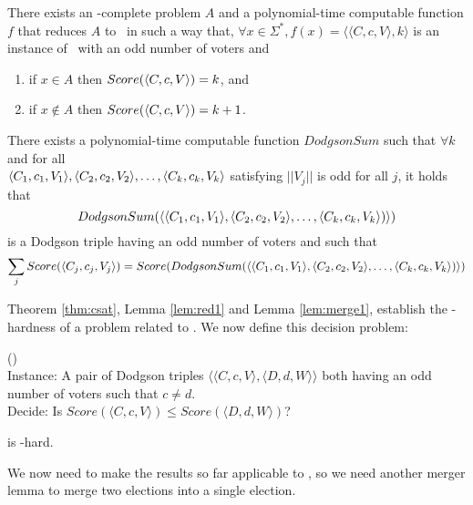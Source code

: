 \begin{lemma} \label{lem:red1}
    There exists an \np-complete problem $A$ and a polynomial-time
    computable function $f$ that reduces $A$ to \dscore~in such
    a way that, $\forall x \in \Sigma^*,
    f(x) = \langle \langle C,c,V \rangle, k\rangle $
    is an instance of \dscore~with an odd number of voters and
    \begin{enumerate}
        \item if $x\in A$ then $Score(\langle C,c,V \rangle) = k$, and
        \item if $x\notin A$ then $Score(\langle C,c,V \rangle) = k+1$.
    \end{enumerate}
\end{lemma}

\begin{lemma} \label{lem:merge1}
    There exists a polynomial-time computable function
    $DodgsonSum$ such that $\forall k$ and for all\\
    $\langle C_{1},c_{1},V_{1} \rangle,\langle C_{2},c_{2},V_{2} \rangle, \dots, \langle C_{k},c_{k},V_{k} \rangle$ satisfying
    $||V_j||$ is odd for all $ j$, it holds that
    \[DodgsonSum(\langle \langle C_{1},c_{1},V_{1} \rangle,\langle C_{2},c_{2},V_{2} \rangle, \dots,
    \langle C_{k},c_{k},V_{k} \rangle) \rangle)\]
    is a Dodgson triple having an odd number of voters and such that
    \[\sum_j Score(\langle C_{j},c_{j},V_{j} \rangle) =
    Score(DodgsonSum(\langle \langle C_{1},c_{1},V_{1} \rangle,\langle C_{2},c_{2},V_{2} \rangle, \dots,
    \langle C_{k},c_{k},V_{k} \rangle) \rangle)\]
\end{lemma}

Theorem \ref{thm:csat}, Lemma \ref{lem:red1} and Lemma
\ref{lem:merge1}, establish the \tp-hardness of a problem related to
. We now define this decision problem:

\begin{problem}{ ()} \\
    \tab Instance: A pair of Dodgson triples
$\langle \langle C,c,V \rangle, \langle D,d,W \rangle \rangle$
both having an odd number of voters such that $c\neq d$.\\
    \tab Decide: Is 
$Score(\langle C,c,V \rangle)\leq Score(\langle D,d,W \rangle)$?
\end{problem}

\begin{lemma} \label{lem:2er}
     is \tp-hard.
\end{lemma}

We now need to make the results so far applicable to 
, so we need another merger lemma to
merge two elections into a single election.

